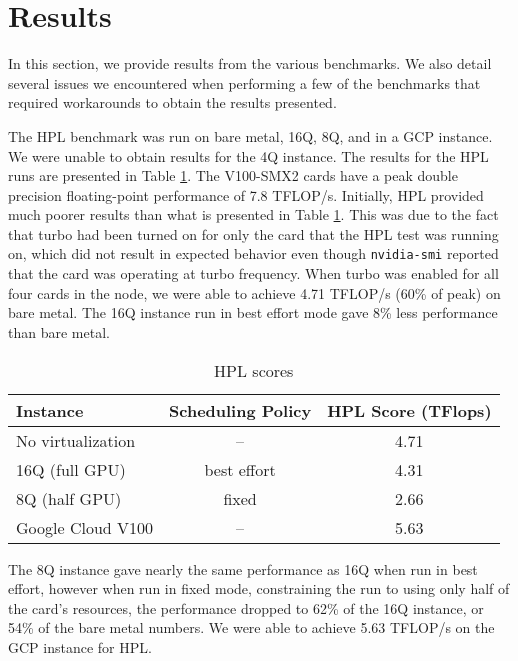 \documentclass[conference]{IEEEtran}
\begin{document}
\section{Results}\label{sec:results}
In this section, we provide results from the various benchmarks. We also detail several issues we encountered when performing a few of the benchmarks that required workarounds to obtain the results presented.

The HPL benchmark was run on bare metal, 16Q, 8Q, and in a GCP instance. We were unable to obtain results for the 4Q instance. The results for the HPL runs are presented in Table \ref{tab:hpl}. The V100-SMX2 cards have a peak double precision floating-point performance of 7.8 TFLOP/s. Initially, HPL provided much poorer results than what is presented in Table \ref{tab:hpl}. This was due to the fact that turbo had been turned on for only the card that the HPL test was running on, which did not result in expected behavior even though {\tt nvidia-smi} reported that the card was operating at turbo frequency. When turbo was enabled for all four cards in the node, we were able to achieve 4.71 TFLOP/s (60\% of peak) on bare metal. The 16Q instance run in best effort mode gave 8\% less performance than bare metal.  
\begin{table}[t]
\centering
\caption{HPL scores}
\label{tab:hpl}

\begin{tabular}{lcc}
\toprule
\textbf{Instance} & \textbf{Scheduling Policy} & \textbf{HPL Score (TFlops)} \\
\midrule
No virtualization & -- & 4.71 \\
16Q (full GPU) & best effort & 4.31\\
8Q (half GPU) & fixed & 2.66\\
Google Cloud V100 & -- & 5.63 \\

\bottomrule
\end{tabular}
\end{table}
The 8Q instance gave nearly the same performance as 16Q when run in best effort, however when run in fixed mode, constraining the run to using only half of the card's resources, the performance dropped to 62\% of the 16Q instance, or 54\% of the bare metal numbers. We were able to achieve 5.63 TFLOP/s on the GCP instance for HPL.  
\end{document}
